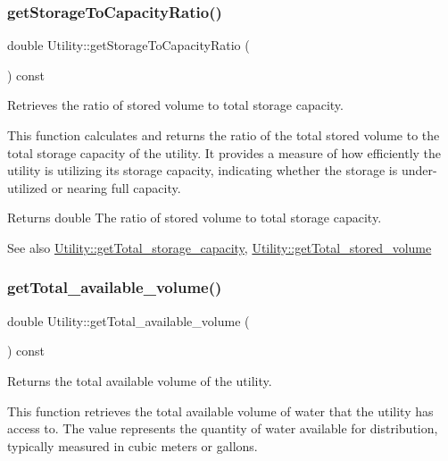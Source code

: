 \subsubsection{\texorpdfstring{get\+Storage\+To\+Capacity\+Ratio()}{getStorageToCapacityRatio()}}
{\footnotesize\ttfamily double Utility\+::get\+Storage\+To\+Capacity\+Ratio (\begin{DoxyParamCaption}{ }\end{DoxyParamCaption}) const}



Retrieves the ratio of stored volume to total storage capacity. 

This function calculates and returns the ratio of the total stored volume to the total storage capacity of the utility. It provides a measure of how efficiently the utility is utilizing its storage capacity, indicating whether the storage is under-\/utilized or nearing full capacity.

\begin{DoxyReturn}{Returns}
double The ratio of stored volume to total storage capacity.
\end{DoxyReturn}
\begin{DoxySeeAlso}{See also}
\mbox{\hyperlink{classUtility_a16f8269dc5f80c1d079c49f33495f620}{Utility\+::get\+Total\+\_\+storage\+\_\+capacity}}, \mbox{\hyperlink{classUtility_a5d932aef9e201e824ac681cd6928613a}{Utility\+::get\+Total\+\_\+stored\+\_\+volume}} 
\end{DoxySeeAlso}
\mbox{\label{classUtility_a6128e9ac10cc873773112593b5788d81}} 
\subsubsection{\texorpdfstring{get\+Total\+\_\+available\+\_\+volume()}{getTotal\_available\_volume()}}
{\footnotesize\ttfamily double Utility\+::get\+Total\+\_\+available\+\_\+volume (\begin{DoxyParamCaption}{ }\end{DoxyParamCaption}) const}



Returns the total available volume of the utility. 

This function retrieves the total available volume of water that the utility has access to. The value represents the quantity of water available for distribution, typically measured in cubic meters or gallons.

